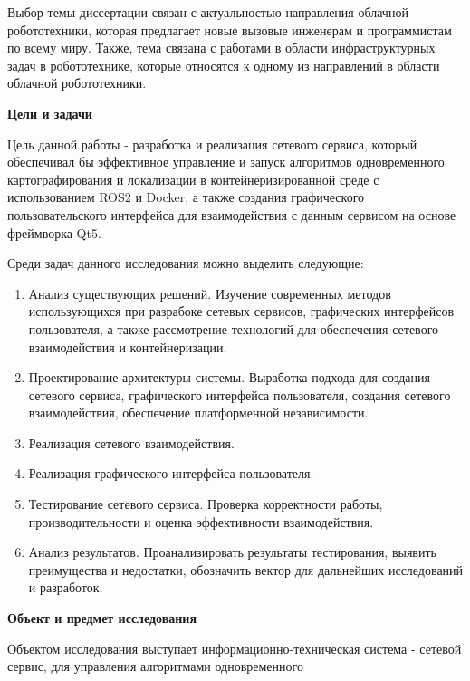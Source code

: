 \documentclass[a4paper, 14pt]{extreport}
\begin{document}
\par Выбор темы диссертации связан с актуальностью направления облачной робототехники, которая предлагает новые вызовые инженерам и программистам по всему миру.
 Также, тема связана с работами в области инфраструктурных задач в робототехнике, которые относятся к одному из направлений в области облачной робототехники.
\vspace{2mm}
\par\noindent\textbf{Цели и задачи}
\vspace{2mm}
\par Цель данной работы - разработка и реализация сетевого сервиса, который обеспечивал бы эффективное управление и запуск алгоритмов
 одновременного картографирования и локализации в контейнеризированной среде с использованием ROS2\cite{rosMain} и Docker\cite{dockerCommon}\cite{dockerPrep},
 а также создания графического пользовательского интерфейса для взаимодействия с данным сервисом на основе фреймворка Qt5\cite{qt5Book}\cite{qt5API}.
\par\noindent Среди задач данного исследования можно выделить следующие:
\begin{enumerate}
        \item Анализ существующих решений. Изучение современных методов использующихся при разрабоке сетевых сервисов, графических 
              интерфейсов пользователя, а также рассмотрение технологий для обеспечения сетевого взаимодействия и контейнеризации.
        \item Проектирование архитектуры системы. Выработка подхода для создания сетевого сервиса, графического интерфейса пользователя,
              создания сетевого взаимодействия, обеспечение платформенной независимости.
        \item Реализация сетевого взаимодействия.
        \item Реализация графического интерфейса пользователя.
        \item Тестирование сетевого сервиса. Проверка корректности работы, производительности и оценка эффективности взаимодействия.
        \item Анализ результатов. Проанализировать результаты тестирования, выявить преимущества и недостатки, обозначить вектор для
              дальнейших исследований и разработок.
\end{enumerate}
\vspace{2mm}
\par\noindent\textbf{Объект и предмет исследования}
\par Объектом исследования выступает информационно-техническая система - сетевой сервис, для управления алгоритмами одновременного
\end{document}
